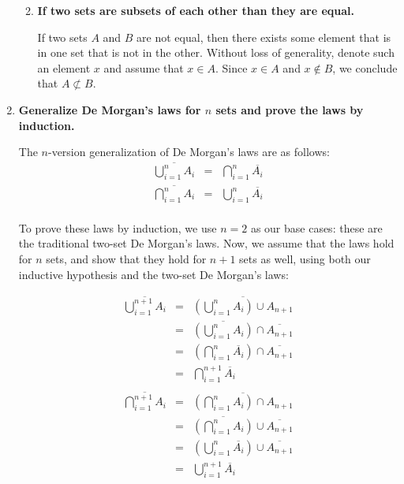 \documentclass[12pt]{amsart}
\begin{document}
\begin{enumerate}
\begin{enumerate}
\medskip

\item {\bf If two sets are subsets of each other than they are equal.}

If two sets $A$ and $B$ are not equal, then there exists some element
that is in one set that is not in the other.  Without loss of
generality, denote such an element $x$ and assume that $x \in A$.
Since $x \in A$ and $x \notin B$, we conclude that $A \not\subset B$.

\end{enumerate}

\medskip

\item {\bf Generalize De Morgan's laws for $n$ sets and prove the laws by induction.}

The $n$-version generalization of De Morgan's laws are as follows:
\begin{eqnarray*}
\overline{\bigcup_{i=1}^n A_i} & = & \bigcap_{i=1}^n \overline{A_i} \\
\overline{\bigcap_{i=1}^n A_i} & = & \bigcup_{i=1}^n \overline{A_i} \\
\end{eqnarray*}

To prove these laws by induction, we use $n=2$ as our base cases:
these are the traditional two-set De Morgan's laws.  Now, we assume
that the laws hold for $n$ sets, and show that they hold for $n+1$
sets as well, using both our inductive hypothesis and the two-set De
Morgan's laws:

\begin{eqnarray*}
\overline{\bigcup_{i=1}^{n+1} A_i} & = & \overline{(\bigcup_{i=1}^n A_i) \cup A_{n+1}} \\
& = & \overline{(\bigcup_{i=1}^n A_i)} \cap \overline{A_{n+1}} \\
& = & (\bigcap_{i=1}^n \overline{A_i}) \cap \overline{A_{n+1}} \\
& = & \bigcap_{i=1}^{n+1} \overline{A_i} \\
& & \\
\overline{\bigcap_{i=1}^{n+1} A_i} & = & \overline{(\bigcap_{i=1}^n A_i) \cap A_{n+1}} \\
& = & \overline{(\bigcap_{i=1}^n A_i)} \cup \overline{A_{n+1}} \\
& = & (\bigcup_{i=1}^n \overline{A_i}) \cup \overline{A_{n+1}} \\
& = & \bigcup_{i=1}^{n+1} \overline{A_i} \\
\end{eqnarray*}


\end{enumerate}
\end{document}
